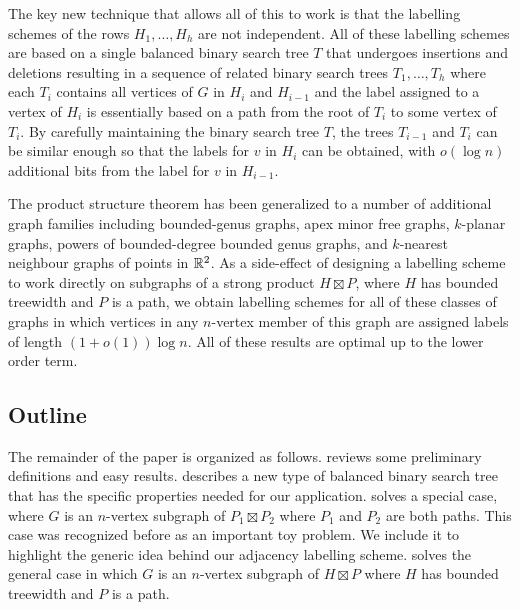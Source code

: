 \documentclass[kpfonts]{patmorin}
\begin{document}
The key new technique that allows all of this to work is that the labelling schemes of the rows $H_1,\ldots,H_h$ are not independent.  All of these labelling schemes are based on a single balanced binary search tree $T$ that undergoes insertions and deletions resulting in a sequence of related binary search trees $T_1,\ldots,T_h$ where each $T_i$ contains all vertices of $G$ in $H_{i}$ and $H_{i-1}$ and the label assigned to a vertex of $H_i$ is essentially based on a path from the root of $T_i$ to some vertex of $T_i$.  By carefully maintaining the binary search tree $T$, the trees $T_{i-1}$ and $T_{i}$ can be similar enough so that the labels for $v$ in $H_i$ can be obtained, with $o(\log n)$ additional bits from the label for $v$ in $H_{i-1}$.

The product structure theorem has been generalized to a number of additional graph families including bounded-genus graphs, apex minor free graphs, $k$-planar graphs, powers of bounded-degree bounded genus graphs, and $k$-nearest neighbour graphs of points in $\mathbb{R}^2$. As a side-effect of designing a labelling scheme to work directly on subgraphs of a strong product $H\boxtimes P$, 
where $H$ has bounded treewidth and $P$ is a path, 
we obtain labelling schemes for all of these classes of graphs in which vertices in any $n$-vertex member of this graph are assigned labels of length $(1+o(1))\log n$.  All of these results are optimal up to the lower order term.

\subsection{Outline}

The remainder of the paper is organized as follows.  reviews some preliminary definitions and easy results.   describes a new type of balanced binary search tree that has the specific properties needed for our application.  solves a special case, where $G$ is an $n$-vertex subgraph of $P_1\boxtimes P_2$ where $P_1$ and $P_2$ are both paths.  
This case was recognized before as an important toy problem. We include it to highlight the generic idea behind our adjacency labelling scheme.  solves the general case in which $G$ is an $n$-vertex subgraph of $H\boxtimes P$ where $H$ has bounded treewidth and $P$ is a path.  
\end{document}
